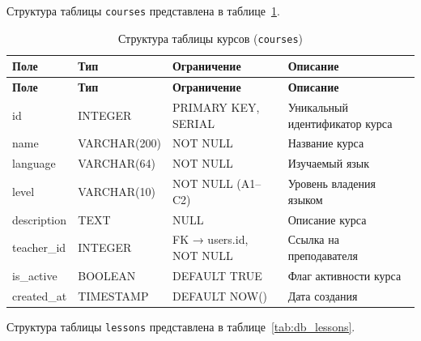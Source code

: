 Структура таблицы \texttt{courses} представлена в таблице~\ref{tab:db_courses}.

{\small
\begin{longtable}{|p{3.8cm}|p{2.8cm}|p{3.5cm}|p{4.4cm}|}
    \caption{Структура таблицы курсов (\texttt{courses})}
    \label{tab:db_courses} \\
    \hline
    \textbf{Поле} & \textbf{Тип} & \textbf{Ограничение} & \textbf{Описание} \\ \hline
    \endfirsthead
    \tabcont{\ref{tab:db_courses}}
    \textbf{Поле} & \textbf{Тип} & \textbf{Ограничение} & \textbf{Описание} \\ \hline
    \endhead
    \hline \endfoot
    \hline \endlastfoot
    id          & INTEGER      & PRIMARY KEY, SERIAL         & Уникальный идентификатор курса \\ \hline
    name        & VARCHAR(200) & NOT NULL                    & Название курса \\ \hline
    language    & VARCHAR(64)  & NOT NULL                    & Изучаемый язык \\ \hline
    level       & VARCHAR(10)  & NOT NULL (A1--C2)           & Уровень владения языком \\ \hline
    description & TEXT         & NULL                        & Описание курса \\ \hline
    teacher\_id & INTEGER      & FK → users.id, NOT NULL     & Ссылка на преподавателя \\ \hline
    is\_active  & BOOLEAN      & DEFAULT TRUE                & Флаг активности курса \\ \hline
    created\_at & TIMESTAMP    & DEFAULT NOW()               & Дата создания \\ \hline
\end{longtable}
}

Структура таблицы \texttt{lessons} представлена в таблице~\ref{tab:db_lessons}.

